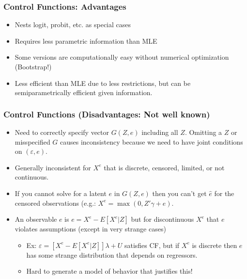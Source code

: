 \documentclass[11pt,dvipsnames,table,aspectratio=169]{beamer}
\begin{document}
\begin{frame}
\frametitle{Control Functions: Advantages}
\begin{itemize}
\item Nests logit, probit, etc. as special cases
\item Requires less parametric information than MLE
\item Some versions are computationally easy without numerical optimization (Bootstrap!)
\item Less efficient than MLE due to less restrictions, but can be semiparametrically efficient given information.
\end{itemize}
\end{frame}

\begin{frame}
\frametitle{Control Functions (Disadvantages: Not well known)}
\begin{itemize}
\item Need to correctly specify vector $G(Z,e)$ including all $Z$. Omitting a $Z$ or misspecified $G$ causes inconsistency because we need to have joint conditions on $(\varepsilon , e)$.
\item Generally inconsistent for $X^e$ that is discrete, censored, limited, or not continuous.
\item If you cannot solve for a latent $e$ in $G(Z,e)$ then you can't get $\hat{e}$ for the censored observations (e.g.: $X^e = \max(0, Z'\gamma + e)$.
\item An observable $e$ is $e = X^e - E[X^e | Z]$ but for discontinuous $X^e$ that $e$ violates assumptions (except in very strange cases)
\begin{itemize}
\item Ex: $\varepsilon =  [ X^e - E[X^e | Z]] \lambda + U$ satisfies CF, but if $X^e$ is discrete then $e$ has some strange distribution that depends on regressors. 
\item Hard to generate a model of behavior that justifies this!
\end{itemize}
\end{itemize}
\end{frame}
\end{document}
